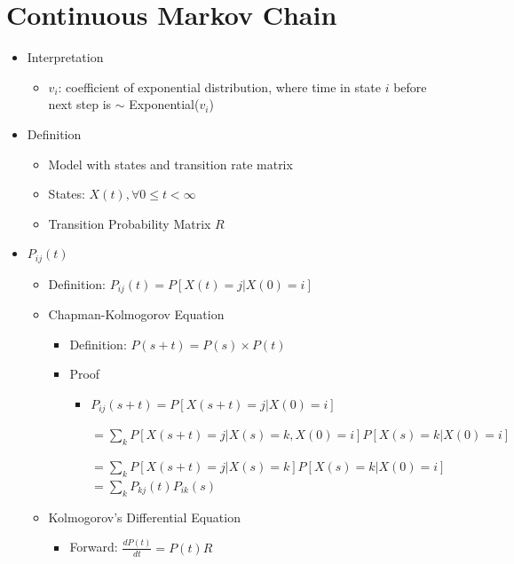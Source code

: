 \documentclass[a4paper]{article}
\begin{document}
\section{Continuous Markov Chain}
\begin{itemize}
    \item Interpretation
        \begin{itemize}
            \item $v_i$: coefficient of exponential distribution, where time in state $i$ before next step is $\sim$ Exponential($v_i$)
        \end{itemize}
    \item Definition
        \begin{itemize}
            \item Model with states and transition rate matrix
            \item States: $X(t), \forall 0 \leq t < \infty$
            \item Transition Probability Matrix $R$
        \end{itemize}
    \item $P_{ij}(t)$
        \begin{itemize}
            \item Definition: $P_{ij}(t) = P[X(t) = j | X(0) = i]$
            \item Chapman-Kolmogorov Equation
                \begin{itemize}
                    \item Definition: $P(s+t) = P(s) \times P(t)$
                    \item Proof
                        \begin{itemize}
                            \item $P_{ij}(s+t) = P[X(s+t) = j| X(0) = i]$

                                $= \sum_k P[X(s+t) = j| X(s) = k, X(0) = i] P[X(s)=k| X(0) = i]$

                                $= \sum_k P[X(s+t) = j| X(s) = k] P[X(s)=k| X(0) = i]$
                                $= \sum_k P_{kj}(t) P_{ik}(s)$
                        \end{itemize}
                \end{itemize}
            \item Kolmogorov's Differential Equation
                \begin{itemize}
                    \item Forward: $\frac{d P(t)}{dt} = P(t) R$


\end{itemize}
\end{itemize}
\end{itemize}
\end{document}
